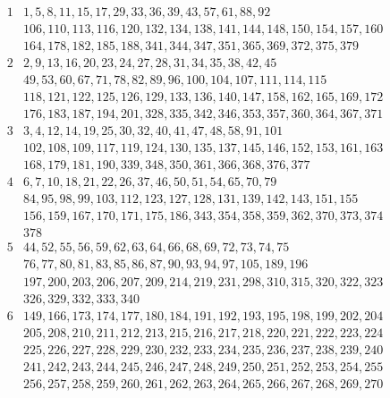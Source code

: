 \begin{table}[H]
\[
\begin{array}{|*{2}{c|}}
	\hline
	1 & 1, 5, 8, 11, 15, 17, 29, 33, 36, 39, 43, 57, 61, 88, 92 \\
	& 106, 110, 113, 116, 120, 132, 134, 138, 141, 144, 148, 150, 154, 157, 160 \\
	& 164, 178, 182, 185, 188, 341, 344, 347, 351, 365, 369, 372, 375, 379\\
	\hline
	2 & 2, 9, 13, 16, 20, 23, 24, 27, 28, 31, 34, 35, 38, 42, 45\\
	& 49, 53, 60, 67, 71, 78, 82, 89, 96, 100, 104, 107, 111, 114, 115\\
	& 118, 121, 122, 125, 126, 129, 133, 136, 140, 147, 158, 162, 165, 169, 172\\
	& 176, 183, 187, 194, 201, 328, 335, 342, 346, 353, 357, 360, 364, 367, 371\\
	\hline
	3 & 3, 4, 12, 14, 19, 25, 30, 32, 40, 41, 47, 48, 58, 91, 101\\
	& 102, 108, 109, 117, 119, 124, 130, 135, 137, 145, 146, 152, 153, 161, 163\\
	& 168, 179, 181, 190, 339, 348, 350, 361, 366, 368, 376, 377\\
	\hline
	4 & 6, 7, 10, 18, 21, 22, 26, 37, 46, 50, 51, 54, 65, 70, 79\\
	& 84, 95, 98, 99, 103, 112, 123, 127, 128, 131, 139, 142, 143, 151, 155\\
	& 156, 159, 167, 170, 171, 175, 186, 343, 354, 358, 359, 362, 370, 373, 374\\
	& 378\\
	\hline
	5 & 44, 52, 55, 56, 59, 62, 63, 64, 66, 68, 69, 72, 73, 74, 75\\
	& 76, 77, 80, 81, 83, 85, 86, 87, 90, 93, 94, 97, 105, 189, 196\\
	& 197, 200, 203, 206, 207, 209, 214, 219, 231, 298, 310, 315, 320, 322, 323\\
	& 326, 329, 332, 333, 340\\
	\hline
	6 & 149, 166, 173, 174, 177, 180, 184, 191, 192, 193, 195, 198, 199, 202, 204\\
	& 205, 208, 210, 211, 212, 213, 215, 216, 217, 218, 220, 221, 222, 223, 224\\
	& 225, 226, 227, 228, 229, 230, 232, 233, 234, 235, 236, 237, 238, 239, 240\\
	& 241, 242, 243, 244, 245, 246, 247, 248, 249, 250, 251, 252, 253, 254, 255\\
	& 256, 257, 258, 259, 260, 261, 262, 263, 264, 265, 266, 267, 268, 269, 270\\

\end{array}\]
\end{table}
